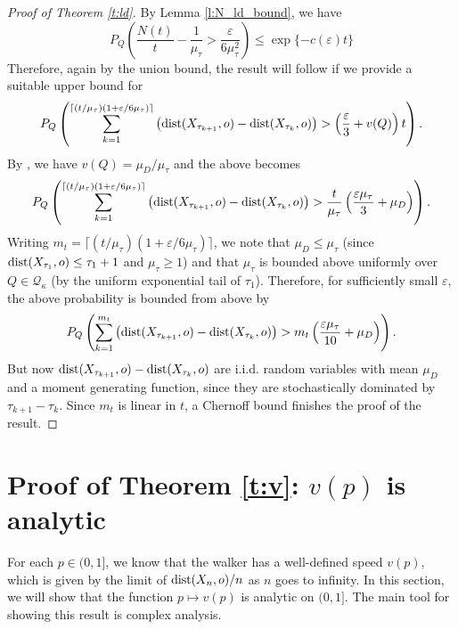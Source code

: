 \documentclass[a4paper]{amsart}
\newcommand{\D}[1]{{\rm dist}(X_{#1},o)}
\newcommand{\mutau}{\mu_{\tau}}
\newcommand{\mudtau}{\mu_{D}}
\begin{document}
\begin{proof}[Proof of Theorem \ref{t:ld}]
By Lemma \ref{l:N_ld_bound}, we have
\begin{equation}
    P_Q \left(
            \frac{N(t)}{t} - \frac{1}{\mutau}
            >
        \frac{\varepsilon}{6\mutau^2}
    \right)
        \leq
            \exp\{ -c(\varepsilon) t\}
\end{equation}
Therefore, again by the union bound, the result will follow if we provide a suitable upper bound for
\begin{equation}
    P_Q \left(
        \sum_{k = 1}^{\lceil(t/\mutau)(1+\varepsilon/6\mutau)\rceil}
           \left(
                \D{\tau_{k+1}} 
                -
                \D{\tau_{k}}
           \right)
            >
        \left( 
            \frac{\varepsilon}{3} + v(Q) 
        \right) t
    \right).
\end{equation}  
By \cite[Theorem 3]{ribeiro2023}, we have $v(Q) = \mudtau / \mutau$ and the above becomes
\begin{equation}
    P_Q \left(
        \sum_{k = 1}^{\lceil(t/\mutau)(1+\varepsilon/6\mutau)\rceil}
           \left(
                \D{\tau_{k+1}} 
                -
                \D{\tau_{k}}
           \right)
            >
        \frac{t}{\mutau} 
            \left( 
                \frac{\varepsilon\mutau}{3} + \mudtau 
            \right)
    \right).
\end{equation}  
Writing $m_t = \lceil(t/\mutau)(1+\varepsilon/6\mutau)\rceil$, we note that $\mudtau \le \mutau$ (since $\D{\tau_1} \le \tau_1 + 1$ and $\mutau \ge 1$) and that $\mutau$ is bounded above uniformly over $Q \in \mathcal{Q}_\kappa$ (by the uniform exponential tail of $\tau_1$). Therefore, for sufficiently small $\varepsilon$, the above probability is bounded from above by
\begin{equation}
    P_Q \left(
        \sum_{k = 1}^{m_t}
           \left(
                \D{\tau_{k+1}} 
                -
                \D{\tau_{k}}
           \right)
            >
        m_t 
            \left( 
                \frac{\varepsilon\mutau}{10} + \mudtau 
            \right)
    \right).
\end{equation}  
But now  $\D{\tau_{k+1}}-\D{\tau_{k}}$ are i.i.d. random variables with mean $\mudtau$ and a moment generating function, since they are stochastically dominated by $\tau_{k+1} - \tau_k$. Since $m_t$ is linear in $t$, a Chernoff bound finishes the proof of the result.
\end{proof}

\section{Proof of Theorem \ref{t:v}: $v(p)$ is analytic}\label{s:analyticity}
For each $p \in (0,1]$, we know that the walker has a well-defined speed $v(p)$, which is given by the limit of $\D{n}/n$ as $n$ goes to infinity. In this section, we will show that the function $p \mapsto v(p)$ is analytic on $(0,1]$. The main tool for showing this result is complex analysis.
\end{document}
